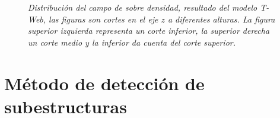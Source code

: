 \begin{figure} 
\centering 
{} 
\caption[Distribución del campo de sobre densidad]{\emph{Distribución del campo de sobre densidad, resultado del modelo T-Web, las figuras son cortes en el eje $z$ a diferentes alturas. La figura superior izquierda representa un corte inferior, la superior derecha un corte medio  y la inferior da cuenta del corte superior.}} 
\label{fig: Campo de densidad } 
\end{figure}




\section{Método de detección de subestructuras}
\label{sec: detección sub-estructuras}


